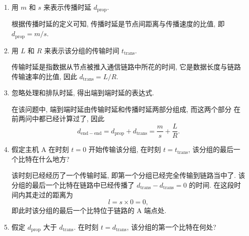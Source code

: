 \documentclass[10pt,UTF8]{ctexbook} %
\begin{document}
\begin{example}
\begin{figure}[H]
\begin{tikzpicture}[x=0.75pt,y=0.75pt,yscale=-1,xscale=1]
        
        \end{tikzpicture}
    \end{figure}
    \begin{enumerate}[label={$\left.\mathrm{\alph*}\right)$}, itemsep=0pt]
        \item 用 $m$ 和 $s$ 来表示传播时延 $d_\mathrm{prop}$.
        \begin{sol}
            根据传播时延的定义可知, 传播时延是节点间距离与传播速度的比值, 即
            $d_\mathrm{prop} = m/s$.
        \end{sol}
        \item 用 $L$ 和 $R$ 来表示该分组的传输时间 $t_\mathrm{trans}$.
        \begin{sol}
            传输时延是指数据从节点被推入通信链路中所花的时间,
            它是数据长度与链路传输速率的比值, 因此 $d_\mathrm{trans} = L/R$.
        \end{sol}
        \item 忽略处理和排队时延, 得出端到端时延的表达式.
        \begin{sol}
            在该问题中, 端到端时延由传输时延和传播时延两部分组成, 而这两个部分
            在前两问中都已经计算过了, 因此
            \[ d_\mathrm{end-end} = d_\mathrm{prop} + d_\mathrm{trans}
            = \dfrac{m}{s} + \dfrac{L}{R}. \]
        \end{sol}
        \item 假定主机 A 在时刻 $t=0$ 开始传输该分组, 在时刻 $t = t_\mathrm{trans}$,
        该分组的最后一个比特在什么地方?
        \begin{sol}
            该时刻已经经历了一个传输时延, 即第一个分组已经完全传输到链路当中了.
            该分组的最后一个比特在链路中已经传播了 $d_\mathrm{trans} - d_\mathrm{trans}
            = 0$ 的时间. 在这段时间内其走过的距离为
            \[ l = s \times 0 = 0, \]
            即此时该分组的最后一个比特位于链路的 A 端点处.
        \end{sol}
        \item 假定 $d_\mathrm{prop}$ 大于 $d_\mathrm{trans}$. 
        在时刻 $t = d_\mathrm{trans}$, 该分组的第一个比特在何处?
        \begin{sol}

\end{sol}
\end{enumerate}
\end{example}
\end{document}
